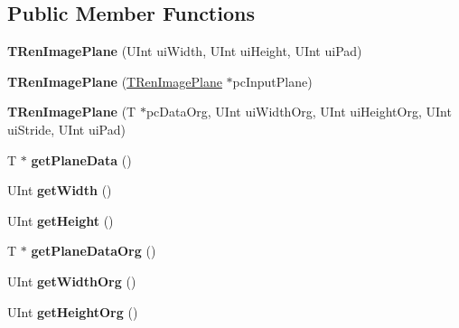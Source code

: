 \subsection*{Public Member Functions}
\begin{DoxyCompactItemize}
\item 
\mbox{\label{class_t_ren_image_plane_a3ff4670a26ed63306ad313dd1d00b548}} 
{\bfseries T\+Ren\+Image\+Plane} (U\+Int ui\+Width, U\+Int ui\+Height, U\+Int ui\+Pad)
\item 
\mbox{\label{class_t_ren_image_plane_a698d9de13e27ef41ecb7432d32c83002}} 
{\bfseries T\+Ren\+Image\+Plane} (\hyperlink{class_t_ren_image_plane}{T\+Ren\+Image\+Plane} $\ast$pc\+Input\+Plane)
\item 
\mbox{\label{class_t_ren_image_plane_a4ac968cdbff68ba4225126b6108446d4}} 
{\bfseries T\+Ren\+Image\+Plane} (T $\ast$pc\+Data\+Org, U\+Int ui\+Width\+Org, U\+Int ui\+Height\+Org, U\+Int ui\+Stride, U\+Int ui\+Pad)
\item 
\mbox{\label{class_t_ren_image_plane_a4f55d443052d3d35f59f8ff75724282d}} 
T $\ast$ {\bfseries get\+Plane\+Data} ()
\item 
\mbox{\label{class_t_ren_image_plane_a5bfb518f2648ae5bc9e6ef18e7978057}} 
U\+Int {\bfseries get\+Width} ()
\item 
\mbox{\label{class_t_ren_image_plane_a0e72c4ea588d585851d2f0418a2df91c}} 
U\+Int {\bfseries get\+Height} ()
\item 
\mbox{\label{class_t_ren_image_plane_acb78848ae14bc3d75c65b06bc88b6dc0}} 
T $\ast$ {\bfseries get\+Plane\+Data\+Org} ()
\item 
\mbox{\label{class_t_ren_image_plane_ae03377c8991b46651bed212b58056ec8}} 
U\+Int {\bfseries get\+Width\+Org} ()
\item 
\mbox{\label{class_t_ren_image_plane_a563f2d54c29102fd3db236a9ddf56f23}} 
U\+Int {\bfseries get\+Height\+Org} ()
\item 

\end{DoxyCompactItemize}
